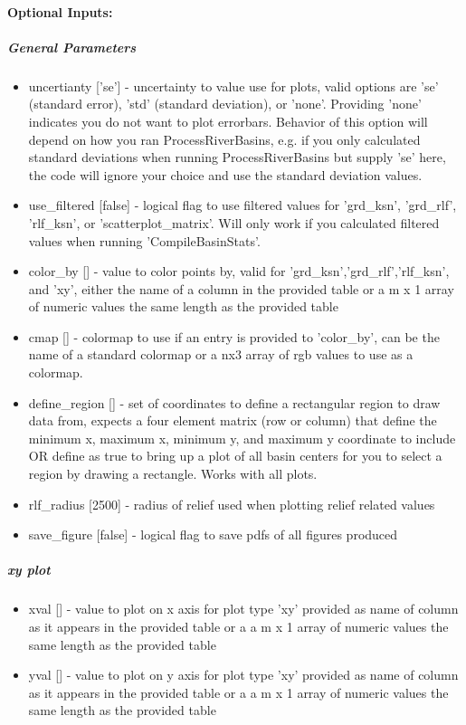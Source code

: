 \paragraph{Optional Inputs:}

\subparagraph{General Parameters}
\begin{itemize}
\item uncertianty ['se'] - uncertainty to value use for plots, valid options are 'se' (standard error), 'std' (standard deviation), or 'none'. 
Providing 'none' indicates you do not want to plot errorbars. Behavior of this option will depend on how you ran ProcessRiverBasins, 
e.g. if you only calculated standard deviations when running ProcessRiverBasins but supply 'se'	here, the code will ignore your choice
and use the standard deviation values.
\item use\_filtered [false] - logical flag to use filtered values for 'grd\_ksn', 'grd\_rlf', 'rlf\_ksn', or 'scatterplot\_matrix'. Will only work if 
you calculated filtered values when running 'CompileBasinStats'.
\item color\_by [] - value to color points by, valid for 'grd\_ksn','grd\_rlf','rlf\_ksn', and 'xy', either the name of a column in the provided table
or a m x 1 array of numeric values the same length as the provided table
\item cmap [] - colormap to use if an entry is provided to 'color\_by', can be the name of a standard colormap or a nx3 array of rgb values
to use as a colormap. 
\item define\_region [] - set of coordinates to define a rectangular region to draw data from, expects a four element matrix (row or column) that define
the minimum x, maximum x, minimum y, and maximum y coordinate to include OR define as true to bring up a plot of all basin centers
for you to select a region by drawing a rectangle. Works with all plots.
\item rlf\_radius [2500] - radius of relief used when plotting relief related values
\item save\_figure [false] - logical flag to save pdfs of all figures produced
\end{itemize}

\subparagraph{xy plot}
\begin{itemize}
\item xval [] - value to plot on x axis for plot type 'xy' provided as name of column as it appears in the provided table or a a m x 1 array of numeric 
values the same length as the provided table 
\item yval [] - value to plot on y axis for plot type 'xy' provided as name of column as it appears in the provided table or a a m x 1 array of numeric 
values the same length as the provided table 
\end{itemize}

